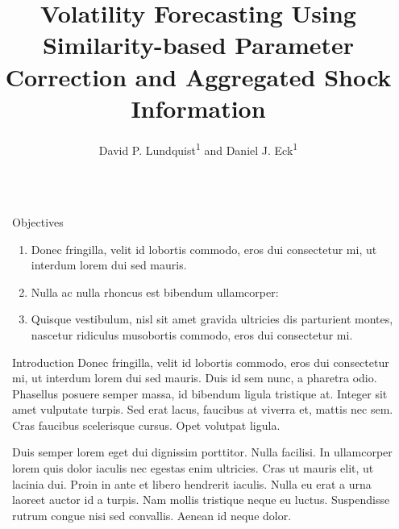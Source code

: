 \documentclass{beamer} %
\title{\LARGE Volatility Forecasting Using Similarity-based Parameter Correction and Aggregated Shock Information} %
\author{David P. Lundquist\textsuperscript{1} and Daniel J. Eck\textsuperscript{1}} %
\institute{\textsuperscript{1}Department of Statistics, University of Illinois Urbana-Champaign} %
\begin{document}
\begin{frame}[t] %

\begin{columns}[t] %

\begin{column}{0.02\textwidth}\end{column} %

\begin{column}{0.465\textwidth} %


\begin{block}{Objectives}
	\begin{enumerate}
		\item Donec fringilla, velit id lobortis commodo, eros dui consectetur mi, ut interdum lorem dui sed mauris.
		\item Nulla ac nulla rhoncus est bibendum ullamcorper:
		\item Quisque vestibulum, nisl sit amet gravida ultricies dis parturient montes, nascetur ridiculus musobortis commodo, eros dui consectetur mi.
	\end{enumerate}
\end{block}

            
\begin{block}{Introduction}
	Donec fringilla, velit id lobortis commodo, eros dui consectetur mi, ut interdum lorem dui sed mauris. Duis id sem nunc, a pharetra odio. Phasellus posuere \alert{semper massa}, id bibendum ligula tristique at. Integer sit amet vulputate turpis. Sed erat lacus, faucibus at viverra et, mattis nec sem. Cras faucibus scelerisque cursus. Opet volutpat ligula.
	
	\bigskip %
	
	Duis semper lorem eget dui dignissim porttitor. \alert{Nulla facilisi.} In ullamcorper lorem quis dolor iaculis nec egestas enim ultricies. Cras ut mauris elit, ut lacinia dui. Proin in ante et libero hendrerit iaculis. Nulla eu erat a urna laoreet auctor id a turpis. Nam mollis tristique neque eu luctus. Suspendisse rutrum congue nisi sed convallis. Aenean id neque dolor.
\end{block}


\end{column}
\end{columns}
\end{frame}
\end{document}
